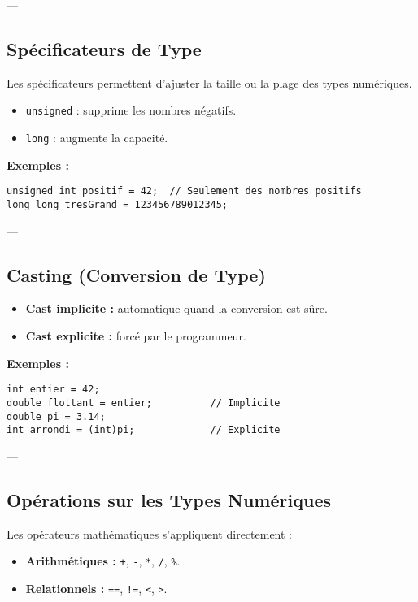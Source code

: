 ---

\subsection{ Spécificateurs de Type}
Les spécificateurs permettent d'ajuster la taille ou la plage des types numériques.
\begin{itemize}
    \item \texttt{unsigned} : supprime les nombres négatifs.
    \item \texttt{long} : augmente la capacité.
\end{itemize}

\textbf{Exemples :}
\begin{tcolorbox}[colframe=blue!50!black, colback=blue!5!white, title=Exemples de Spécificateurs de Type]
\begin{verbatim}
unsigned int positif = 42;  // Seulement des nombres positifs
long long tresGrand = 123456789012345;
\end{verbatim}
\end{tcolorbox}

---

\subsection{ Casting (Conversion de Type)}
\begin{itemize}
    \item \textbf{Cast implicite :} automatique quand la conversion est sûre.
    \item \textbf{Cast explicite :} forcé par le programmeur.
\end{itemize}

\textbf{Exemples :}
\begin{tcolorbox}[colframe=blue!50!black, colback=blue!5!white, title=Exemples de Casting]
\begin{verbatim}
int entier = 42;
double flottant = entier;          // Implicite
double pi = 3.14;
int arrondi = (int)pi;             // Explicite
\end{verbatim}
\end{tcolorbox}

---

\subsection{ Opérations sur les Types Numériques}
Les opérateurs mathématiques s'appliquent directement :
\begin{itemize}
    \item \textbf{Arithmétiques :} \texttt{+}, \texttt{-}, \texttt{*}, \texttt{/}, \texttt{\%}.
    \item \textbf{Relationnels :} \texttt{==}, \texttt{!=}, \texttt{<}, \texttt{>}.
\end{itemize}

